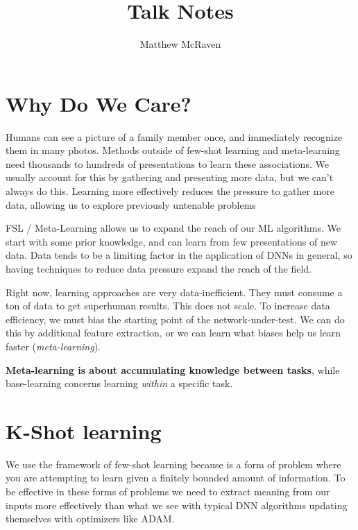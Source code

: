\documentclass[american]{IEEEtran}   	%
\title{Talk Notes}
\author{Matthew McRaven}
\begin{document}
\maketitle


\newenvironment{changemargin}[2]{%
\begin{list}{}{%
\setlength{\topsep}{0pt}%
\setlength{\leftmargin}{#1}%
\setlength{\rightmargin}{#2}%
\setlength{\listparindent}{\parindent}%
\setlength{\itemindent}{\parindent}%
\setlength{\parsep}{\parskip}%
}%
\item[]}{\end{list}}


\section{Why Do We Care?}
Humans can see a picture of a family member once, and immediately recognize them in many photos.
Methods outside of few-shot learning and meta-learning need thousands to hundreds of presentations to learn these associations\cite{Wang_2020}.
We usually account for this by gathering and presenting more data, but we can't always do this.
Learning more effectively reduces the pressure to gather more data, allowing us to explore previously untenable problems\cite{Ravi2017OptimizationAA}

FSL / Meta-Learning allows us to expand the reach of our ML algorithms\cite{Wang_2020}.
We start with some prior knowledge, and can learn from few presentations of new data.
Data tends to be a limiting factor in the application of DNNs in general, so having techniques to reduce data pressure expand the reach of the field.

Right now, learning approaches are very data-inefficient\cite{wang2016learning}.
They must consume a ton of data to get superhuman results.
This does not scale.
To increase data efficiency, we must bias the starting point of the network-under-test.
We can do this by additional feature extraction, or we can learn what biases help us learn faster (\textit{meta-learning}).

\textbf{Meta-learning is about accumulating knowledge between tasks}\cite{Ravi2017OptimizationAA}, while base-learning concerns learning \textit{within} a specific task.




\section{K-Shot learning}
We use the framework of few-shot learning because is a form of problem where you are attempting to learn given a finitely bounded amount of information\cite{Ravi2017OptimizationAA}.
To be effective in these forms of problems we need to extract meaning from our inputs more effectively than what we see with typical DNN algorithms updating themselves with optimizers like ADAM.
\end{document}
